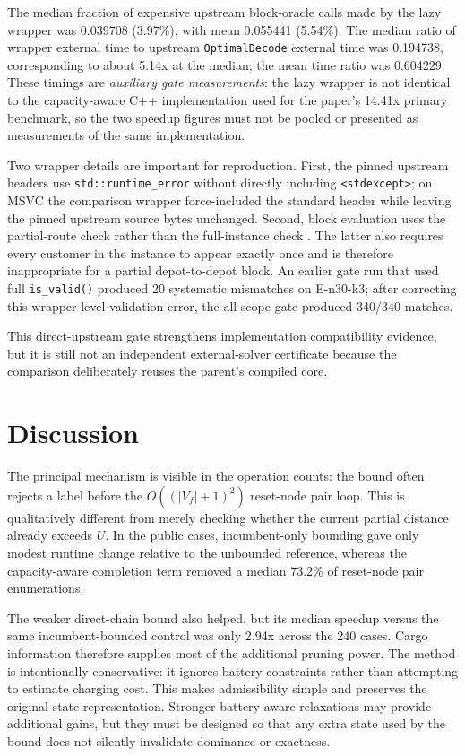 \documentclass[11pt]{article}
\begin{document}
The median fraction of expensive upstream block-oracle calls made by the lazy wrapper was 0.039708 (3.97\%), with mean 0.055441 (5.54\%). The median ratio of wrapper external time to upstream \texttt{OptimalDecode} external time was 0.194738, corresponding to about 5.14x at the median; the mean time ratio was 0.604229. These timings are \emph{auxiliary gate measurements}: the lazy wrapper is not identical to the capacity-aware C++ implementation used for the paper's 14.41x primary benchmark, so the two speedup figures must not be pooled or presented as measurements of the same implementation.

Two wrapper details are important for reproduction. First, the pinned upstream headers use \texttt{std::runtime\_error} without directly including \texttt{<stdexcept>}; on MSVC the comparison wrapper force-included the standard header while leaving the pinned upstream source bytes unchanged. Second, block evaluation uses the partial-route check  rather than the full-instance check . The latter also requires every customer in the instance to appear exactly once and is therefore inappropriate for a partial depot-to-depot block. An earlier gate run that used full \texttt{is\_valid()} produced 20 systematic mismatches on E-n30-k3; after correcting this wrapper-level validation error, the all-scope gate produced 340/340 matches.

This direct-upstream gate strengthens implementation compatibility evidence, but it is still not an independent external-solver certificate because the comparison deliberately reuses the parent's compiled core.

\section{Discussion}
The principal mechanism is visible in the operation counts: the bound often rejects a label before the $O((|V_f|+1)^2)$ reset-node pair loop. This is qualitatively different from merely checking whether the current partial distance already exceeds $U$. In the public cases, incumbent-only bounding gave only modest runtime change relative to the unbounded reference, whereas the capacity-aware completion term removed a median 73.2\% of reset-node pair enumerations.

The weaker direct-chain bound also helped, but its median speedup versus the same incumbent-bounded control was only 2.94x across the 240 cases. Cargo information therefore supplies most of the additional pruning power. The method is intentionally conservative: it ignores battery constraints rather than attempting to estimate charging cost. This makes admissibility simple and preserves the original state representation. Stronger battery-aware relaxations may provide additional gains, but they must be designed so that any extra state used by the bound does not silently invalidate dominance or exactness.
\end{document}
